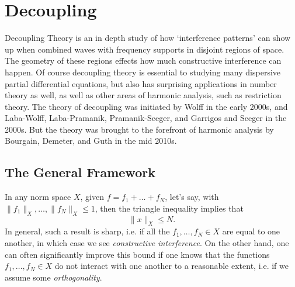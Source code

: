 
\part{Decoupling}

Decoupling Theory is an in depth study of how `interference patterns' can show up when combined waves with frequency supports in disjoint regions of space. The geometry of these regions effects how much constructive interference can happen. Of course decoupling theory is essential to studying many dispersive partial differential equations, but also has surprising applications in number theory as well, as well as other areas of harmonic analysis, such as restriction theory. The theory of decoupling was initiated by Wolff in the early 2000s, and Laba-Wolff, Laba-Pramanik, Pramanik-Seeger, and Garrigos and Seeger in the 2000s. But the theory was brought to the forefront of harmonic analysis by Bourgain, Demeter, and Guth in the mid 2010s.








\chapter{The General Framework}

In any norm space $X$, given $f = f_1 + \dots + f_N$, let's say, with $\| f_1 \|_X, \dots, \| f_N \|_X \leq 1$, then the triangle inequality implies that
%
\[ \| x \|_X \leq N. \]
%
In general, such a result is sharp, i.e. if all the $f_1,\dots, f_N \in X$ are equal to one another, in which case we see \emph{constructive interference}. On the other hand, one can often significantly improve this bound if one knows that the functions $f_1,\dots,f_N \in X$ do not interact with one another to a reasonable extent, i.e. if we assume some \emph{orthogonality}.

